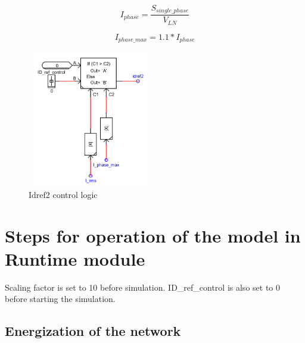 \begin{equation}
    I_{phase} = \frac{S_{single\_phase}}{V_{LN}}
\end{equation}

\begin{equation}\label{i_phase_max_eq}
    I_{phase\_max} = 1.1 * I_{phase}
\end{equation}

\begin{figure}[H]
\centering
    \includegraphics[height = 6cm,width = 5.5cm]{Diagrams/Chapter_4/Idref_control.PNG}
    \caption{Idref2 control logic}
    \label{fig:Idref_control}
\end{figure}

\section{Steps for operation of the model in Runtime module}

Scaling factor is set to 10 before simulation.
ID\_ref\_control is also set to 0 before starting the simulation.

\subsection{Energization of the network}\label{energ_appendix}

